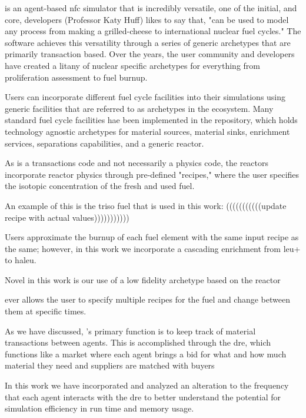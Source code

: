 \cyclus is an agent-based \gls{nfc} simulator that is incredibly
versatile, one of the initial, and core, developers (Professor Katy Huff)
likes to say that, "\cyclus can be used to model any process from making
a grilled-cheese to international nuclear fuel cycles." The software
achieves this versatility through a series of generic archetypes that are
primarily transaction based. Over the years, the user community and
developers have created a litany of nuclear specific archetypes for
everything from proliferation assessment to fuel burnup.

Users can incorporate different fuel cycle facilities into their \cyclus
simulations using generic facilities that are referred to as archetypes
in the \cyclus ecosystem. Many standard fuel cycle facilities hae been
implemented in the \cycamore repository, which holds technology agnostic
archetypes for material sources, material sinks, enrichment services,
separations capabilities, and a generic reactor.

As \cyclus is a transactions code and not necessarily a physics code,
the reactors incorporate reactor physics through pre-defined "recipes,"
where the user specifies the isotopic concentration of the fresh and
used fuel.

An example of this is the \gls{triso} fuel that is used in this work: (((((((((((update recipe with actual values)))))))))))

Users approximate the burnup of each fuel element with the
same input recipe as the same; however, in this work we incorporate a
cascading enrichment from \gls{leu+} to \gls{haleu}.

Novel in this work is our use of a low fidelity archetype based on the
\cycamore reactor %

\gls{ever} allows the user to specify multiple recipes for the fuel and
change between them at specific times.


As we have discussed, \cyclus's primary function is to keep track of
material transactions between agents. This is accomplished through the
\gls{dre}, which functions like a market where each agent brings a bid
for what and how much material they need and suppliers are matched with
buyers %

In this work we have incorporated and analyzed an alteration to the
frequency that each agent interacts with the \gls{dre} to better
understand the potential for simulation efficiency in run time and
memory usage.